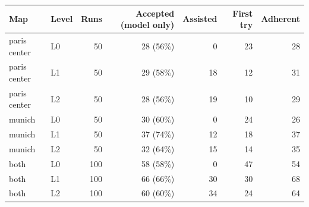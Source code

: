 \begin{tabular}{llrrrrr}
\toprule
Map & Level & Runs & Accepted (model only) & Assisted & First try & Adherent\\
\midrule
paris center & L0 & 50 & 28 (56\%) & 0 & 23 & 28\\
paris center & L1 & 50 & 29 (58\%) & 18 & 12 & 31\\
paris center & L2 & 50 & 28 (56\%) & 19 & 10 & 29\\
\midrule
munich & L0 & 50 & 30 (60\%) & 0 & 24 & 26\\
munich & L1 & 50 & 37 (74\%) & 12 & 18 & 37\\
munich & L2 & 50 & 32 (64\%) & 15 & 14 & 35\\
\bottomrule
both & L0 & 100 & 58 (58\%) & 0 & 47 & 54\\
both & L1 & 100 & 66 (66\%) & 30 & 30 & 68\\
both & L2 & 100 & 60 (60\%) & 34 & 24 & 64\\
\end{tabular}
